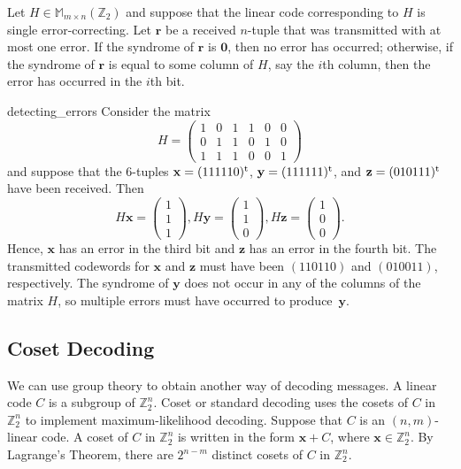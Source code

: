  
\begin{theorem}
Let $H \in {\mathbb M}_{ m \times n} ( {\mathbb Z}_2)$ and suppose that the
linear code corresponding to $H$ is single error-correcting. Let
${\mathbf r}$ be a received $n$-tuple that was transmitted with at most
one error. If the syndrome of ${\mathbf r}$ is ${\mathbf 0}$, then no
error has occurred; otherwise, if the syndrome of ${\mathbf r}$ is equal
to some column of $H$, say the $i$th column, then the error has
occurred in the $i$th bit.  
\end{theorem}
 
 
\begin{example}{detecting_errors}
Consider the matrix
\[
H =
\begin{pmatrix}
1 & 0 & 1 & 1 & 0 & 0 \\
0 & 1 & 1 & 0 & 1 & 0 \\
1 & 1 & 1 & 0 & 0 & 1
\end{pmatrix}
\]
and suppose that the  6-tuples ${\mathbf x} = (111110)^{\rm t}$,
${\mathbf y} = (111111)^{\rm t}$, and ${\mathbf z} = (010111)^{\rm t}$
have been received. Then  
\[
H{\mathbf x} =
\begin{pmatrix}
1 \\ 1 \\ 1 
\end{pmatrix},
H{\mathbf y} =
\begin{pmatrix}
1 \\ 1 \\ 0 
\end{pmatrix},
H{\mathbf z} =
\begin{pmatrix}
1 \\ 0 \\ 0
\end{pmatrix}.
\]
Hence, ${\mathbf x}$ has an error in the third bit and ${\mathbf z}$ has
an error in the fourth bit. The transmitted codewords for ${\mathbf x}$
and ${\mathbf z}$ must have been $(110110)$ and $(010011)$,
respectively. The syndrome of ${\mathbf y}$ does not occur in any of the
columns of the matrix $H$, so multiple
errors must have occurred to produce~${\mathbf y}$.
\end{example}
 
 
\subsection*{Coset Decoding}
 
 
We can use group theory to obtain another way of decoding messages.  A
linear code $C$ is a subgroup of ${\mathbb Z}_2^n$. {\bfi
Coset\/} or {\bfi standard
decoding\/} uses the cosets of $C$ in ${\mathbb
Z}_2^n$ to implement maximum-likelihood decoding. Suppose that $C$ is
an $(n,m)$-linear code. A coset of $C$ in ${\mathbb Z}_2^n$ is written in
the form ${\mathbf x} + C$, where ${\mathbf x} \in {\mathbb Z}_2^n$. By
Lagrange's Theorem, there are $2^{n-m}$ distinct cosets of $C$ in 
${\mathbb Z}_2^n$.
 
